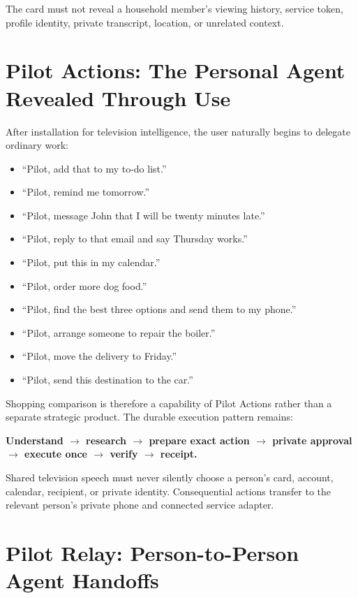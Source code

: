 \documentclass[11pt,a4paper]{article}
\begin{document}
The card must not reveal a household member's viewing history, service token,
profile identity, private transcript, location, or unrelated context.

\section{Pilot Actions: The Personal Agent Revealed Through Use}

After installation for television intelligence, the user naturally begins to
delegate ordinary work:

\begin{itemize}[leftmargin=*]
  \item ``Pilot, add that to my to-do list.''
  \item ``Pilot, remind me tomorrow.''
  \item ``Pilot, message John that I will be twenty minutes late.''
  \item ``Pilot, reply to that email and say Thursday works.''
  \item ``Pilot, put this in my calendar.''
  \item ``Pilot, order more dog food.''
  \item ``Pilot, find the best three options and send them to my phone.''
  \item ``Pilot, arrange someone to repair the boiler.''
  \item ``Pilot, move the delivery to Friday.''
  \item ``Pilot, send this destination to the car.''
\end{itemize}

Shopping comparison is therefore a capability of Pilot Actions rather than a
separate strategic product.  The durable execution pattern remains:

\begin{center}
\textbf{Understand $\rightarrow$ research $\rightarrow$ prepare exact action
$\rightarrow$ private approval $\rightarrow$ execute once $\rightarrow$
verify $\rightarrow$ receipt.}
\end{center}

Shared television speech must never silently choose a person's card, account,
calendar, recipient, or private identity.  Consequential actions transfer to
the relevant person's private phone and connected service adapter.

\section{Pilot Relay: Person-to-Person Agent Handoffs}
\end{document}
